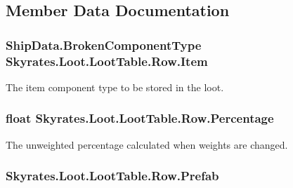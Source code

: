 \subsection{Member Data Documentation}
\hypertarget{class_skyrates_1_1_loot_1_1_loot_table_1_1_row_a4bf5c8a94125e9b55c7a8d54d423e80d}{
\subsubsection[{Item}]{\setlength{\rightskip}{0pt plus 5cm}Ship\-Data.\-Broken\-Component\-Type Skyrates.\-Loot.\-Loot\-Table.\-Row.\-Item}}\label{class_skyrates_1_1_loot_1_1_loot_table_1_1_row_a4bf5c8a94125e9b55c7a8d54d423e80d}


The item component type to be stored in the loot. 

\hypertarget{class_skyrates_1_1_loot_1_1_loot_table_1_1_row_afc1a4debcfbfb5257ee4760bd87581d9}{
\subsubsection[{Percentage}]{\setlength{\rightskip}{0pt plus 5cm}float Skyrates.\-Loot.\-Loot\-Table.\-Row.\-Percentage}}\label{class_skyrates_1_1_loot_1_1_loot_table_1_1_row_afc1a4debcfbfb5257ee4760bd87581d9}


The unweighted percentage calculated when weights are changed. 

\hypertarget{class_skyrates_1_1_loot_1_1_loot_table_1_1_row_a4da28d84576418b42f86ef1f9dafaa1b}{
\subsubsection[{Prefab}]{ Skyrates.\-Loot.\-Loot\-Table.\-Row.\-Prefab}}\label{class_skyrates_1_1_loot_1_1_loot_table_1_1_row_a4da28d84576418b42f86ef1f9dafaa1b}


